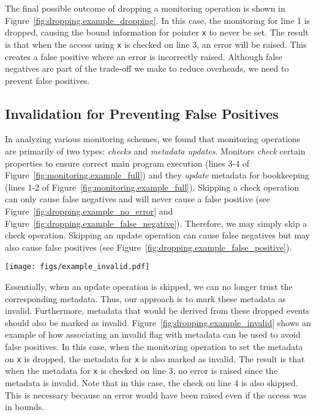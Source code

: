 The final possible outcome of dropping a monitoring operation is shown in
Figure~\ref{fig:dropping.example_dropping}. In this case, the monitoring for
line 1 is dropped, causing the bound information for pointer {\tt x} to never
be set. The result is that when the access using {\tt x} is checked on line 3,
an error will be raised. This creates a false positive where an error is
incorrectly raised. Although false negatives are part of the trade-off we make
to reduce overheads, we need to prevent false positives.

\subsection{Invalidation for Preventing False Positives}
\label{sec:dropping.prevent_false_pos}

In analyzing various monitoring schemes, we found that monitoring operations
are primarily of two types: \emph{checks} and \emph{metadata updates}. Monitors
\emph{check} certain properties to ensure correct main program execution (lines
3-4 of Figure~\ref{fig:monitoring.example_full}) and they \emph{update} metadata
for bookkeeping (lines 1-2 of Figure~\ref{fig:monitoring.example_full}). Skipping
a check operation can only cause false negatives and will never cause a false
positive (see Figure~\ref{fig:dropping.example_no_error} and
Figure~\ref{fig:dropping.example_false_negative}). Therefore, we may simply
skip a check operation. Skipping an update operation can cause false
negatives but may also cause false positives (see
Figure~\ref{fig:dropping.example_false_positive}). 

\begin{figure*}
  \begin{center}
    \texttt{[image: figs/example\_invalid.pdf]}
    \caption{Invalidation flags are used to prevent false positives.}
    \label{fig:dropping.example_invalid}
    \vspace{-0.1in}
  \end{center}
\end{figure*}

Essentially, when an update operation is skipped, we can no longer trust the
corresponding metadata.  Thus, our approach is to mark these metadata as
invalid. Furthermore, metadata that would be derived from these dropped events
should also be marked as invalid. Figure~\ref{fig:dropping.example_invalid}
shows an example of how associating an invalid flag with metadata can be used
to avoid false positives.  In this case, when the monitoring operation to set
the metadata on {\tt x} is dropped, the metadata for {\tt x} is also marked as
invalid. The result is that when the metadata for {\tt x} is checked on line 3,
no error is raised since the metadata is invalid. Note that in this case, the
check on line 4 is also skipped. This is necessary because an error would have
been raised even if the access was in bounds.

